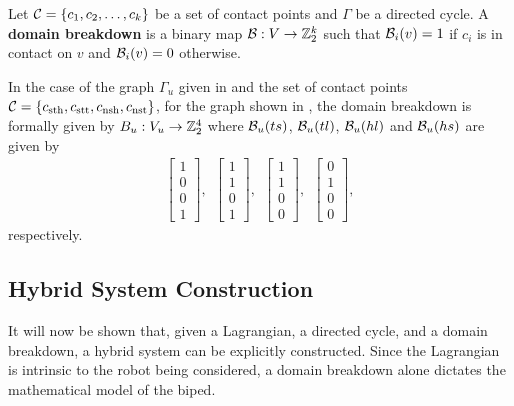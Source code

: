 \begin{definition}
  \label{def:domainbreakdown}
  Let $\mathcal{C} = \{c_{1}, c_{2}, \ldots, c_{k}\}$ be a set of contact points and $\Gamma$ be a directed cycle.
  A {\bf domain breakdown} is a binary map $\mathcal{B} : V \to \mathbb{Z}_{2}^{k}$ such that $\mathcal{B}_{i}(v) = 1$ if $c_{i}$ is in contact on $v$ and $\mathcal{B}_{i}(v) = 0$ otherwise.
\end{definition}

\begin{exmp} \label{ex:domainbreakdown}
  In the case of the graph $\Gamma_{u}$ given in  and the set of contact points $\mathcal{C} =  \{c_{\mathrm{sth}}, c_{\mathrm{stt}}, c_{\mathrm{nsh}}, c_{\mathrm{nst}}\}$, for the graph shown in , the domain breakdown is formally given by $B_{u} : V_{u} \to \mathbb{Z}_{2}^{4}$ where $\mathcal{B}_{u}(ts)$, $\mathcal{B}_{u}(tl)$, $\mathcal{B}_{u}(hl)$ and $\mathcal{B}_{u}(hs)$ are given by
  \begin{align}
    \left[ \begin{array}{c} 1  \\ 0 \\ 0 \\ 1 \end{array} \right], \:\:
    \left[ \begin{array}{c} 1  \\ 1 \\ 0 \\ 1 \end{array} \right], \:\:
    \left[ \begin{array}{c} 1  \\ 1 \\ 0 \\ 0 \end{array} \right], \:\:
    \left[ \begin{array}{c} 0  \\ 1 \\ 0 \\ 0 \end{array} \right],
    \label{eq:domainbreakdownvectors}
  \end{align}
  respectively.
\end{exmp}


\subsection{Hybrid System Construction}

It will now be shown that, given a Lagrangian, a directed cycle, and a domain breakdown, a hybrid system can be explicitly constructed.
%
Since the Lagrangian is intrinsic to the robot being considered, a domain breakdown alone dictates the mathematical model of the biped.


